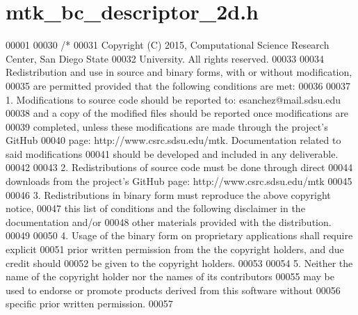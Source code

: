 \hypertarget{mtk__bc__descriptor__2d_8h_source}{\section{mtk\+\_\+bc\+\_\+descriptor\+\_\+2d.\+h}
\label{mtk__bc__descriptor__2d_8h_source}
}

\begin{DoxyCode}
00001 
00030 \textcolor{comment}{/*}
00031 \textcolor{comment}{Copyright (C) 2015, Computational Science Research Center, San Diego State}
00032 \textcolor{comment}{University. All rights reserved.}
00033 \textcolor{comment}{}
00034 \textcolor{comment}{Redistribution and use in source and binary forms, with or without modification,}
00035 \textcolor{comment}{are permitted provided that the following conditions are met:}
00036 \textcolor{comment}{}
00037 \textcolor{comment}{1. Modifications to source code should be reported to: esanchez@mail.sdsu.edu}
00038 \textcolor{comment}{and a copy of the modified files should be reported once modifications are}
00039 \textcolor{comment}{completed, unless these modifications are made through the project's GitHub}
00040 \textcolor{comment}{page: http://www.csrc.sdsu.edu/mtk. Documentation related to said modifications}
00041 \textcolor{comment}{should be developed and included in any deliverable.}
00042 \textcolor{comment}{}
00043 \textcolor{comment}{2. Redistributions of source code must be done through direct}
00044 \textcolor{comment}{downloads from the project's GitHub page: http://www.csrc.sdsu.edu/mtk}
00045 \textcolor{comment}{}
00046 \textcolor{comment}{3. Redistributions in binary form must reproduce the above copyright notice,}
00047 \textcolor{comment}{this list of conditions and the following disclaimer in the documentation and/or}
00048 \textcolor{comment}{other materials provided with the distribution.}
00049 \textcolor{comment}{}
00050 \textcolor{comment}{4. Usage of the binary form on proprietary applications shall require explicit}
00051 \textcolor{comment}{prior written permission from the the copyright holders, and due credit should}
00052 \textcolor{comment}{be given to the copyright holders.}
00053 \textcolor{comment}{}
00054 \textcolor{comment}{5. Neither the name of the copyright holder nor the names of its contributors}
00055 \textcolor{comment}{may be used to endorse or promote products derived from this software without}
00056 \textcolor{comment}{specific prior written permission.}
00057 \textcolor{comment}{}

\end{DoxyCode}
